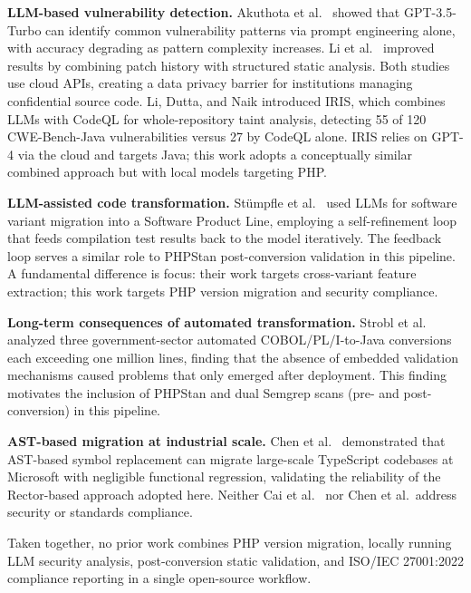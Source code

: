\documentclass[conference]{IEEEtran}
\begin{document}
\textbf{LLM-based vulnerability detection.}
Akuthota et al.\ \cite{akuthota2023vulnerability} showed
that GPT-3.5-Turbo can identify common vulnerability patterns via
prompt engineering alone, with accuracy degrading as pattern
complexity increases. Li et al.\ \cite{li2025software} improved
results by combining patch history with structured static
analysis. Both studies use cloud APIs, creating a data privacy
barrier for institutions managing confidential source code.
Li, Dutta, and Naik \cite{li2025iris} introduced IRIS, which
combines LLMs with CodeQL for whole-repository taint analysis,
detecting 55 of 120 CWE-Bench-Java vulnerabilities versus 27
by CodeQL alone. IRIS relies on GPT-4 via the cloud and targets
Java; this work adopts a conceptually similar combined approach
but with local models targeting PHP.

\textbf{LLM-assisted code transformation.}
St\"{u}mpfle et al.\ \cite{stumpfle2025llm} used LLMs for
software variant migration into a Software Product Line,
employing a self-refinement loop that feeds compilation test
results back to the model iteratively. The feedback loop serves
a similar role to PHPStan post-conversion validation in this
pipeline. A fundamental difference is focus: their work targets
cross-variant feature extraction; this work targets PHP version
migration and security compliance.

\textbf{Long-term consequences of automated transformation.}
Strobl et al.\ \cite{strobl2020automated} analyzed three
government-sector automated COBOL/PL/I-to-Java conversions each
exceeding one million lines, finding that the absence of embedded
validation mechanisms caused problems that only emerged after
deployment. This finding motivates the inclusion of PHPStan and
dual Semgrep scans (pre- and post-conversion) in this pipeline.

\textbf{AST-based migration at industrial scale.}
Chen et al.\ \cite{chen2022ast} demonstrated that AST-based
symbol replacement can migrate large-scale TypeScript codebases
at Microsoft with negligible functional regression, validating
the reliability of the Rector-based approach adopted here.
Neither Cai et al.\ \cite{cai2015pattern} nor Chen et al.\
address security or standards compliance.

Taken together, no prior work combines PHP version migration,
locally running LLM security analysis, post-conversion static
validation, and ISO/IEC 27001:2022 compliance reporting in a
single open-source workflow.

\end{document}
